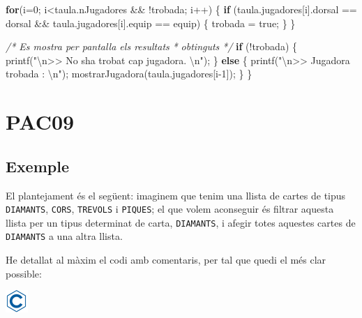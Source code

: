 \documentclass[]{book}
\newenvironment{Shaded}{\begin{snugshade}}{\end{snugshade}}
\newcommand{\CommentTok}[1]{\textcolor[rgb]{0.56,0.35,0.01}{\textit{#1}}}
\newcommand{\ControlFlowTok}[1]{\textcolor[rgb]{0.13,0.29,0.53}{\textbf{#1}}}
\newcommand{\DecValTok}[1]{\textcolor[rgb]{0.00,0.00,0.81}{#1}}
\newcommand{\NormalTok}[1]{#1}
\newcommand{\SpecialCharTok}[1]{\textcolor[rgb]{0.00,0.00,0.00}{#1}}
\newcommand{\StringTok}[1]{\textcolor[rgb]{0.31,0.60,0.02}{#1}}
\begin{document}
\begin{Shaded}
\begin{Highlighting}[]
    \ControlFlowTok{for}\NormalTok{(i=}\DecValTok{0}\NormalTok{; i\textless{}taula.nJugadores \&\& !trobada; i++) \{}
        \ControlFlowTok{if}\NormalTok{ (taula.jugadores[i].dorsal == dorsal \&\&}
\NormalTok{            taula.jugadores[i].equip == equip) \{}
\NormalTok{                trobada = true;}
\NormalTok{        \}}
\NormalTok{    \}}
    
    \CommentTok{/* Es mostra per pantalla els resultats}
\CommentTok{     * obtinguts }
\CommentTok{     */}
    \ControlFlowTok{if}\NormalTok{ (!trobada) \{}
\NormalTok{        printf(}\StringTok{"}\SpecialCharTok{\textbackslash{}n}\StringTok{\textgreater{}\textgreater{} No s\textquotesingle{}ha trobat cap jugadora. }\SpecialCharTok{\textbackslash{}n}\StringTok{"}\NormalTok{);}
\NormalTok{    \} }\ControlFlowTok{else}\NormalTok{ \{}
\NormalTok{        printf(}\StringTok{"}\SpecialCharTok{\textbackslash{}n}\StringTok{\textgreater{}\textgreater{} Jugadora trobada : }\SpecialCharTok{\textbackslash{}n}\StringTok{"}\NormalTok{);}
\NormalTok{        mostrarJugadora(taula.jugadores[i{-}}\DecValTok{1}\NormalTok{]);}
\NormalTok{    \}}
\NormalTok{\}}
\end{Highlighting}
\end{Shaded}

\hypertarget{pac09}{%
\chapter{PAC09}\label{pac09}}

\hypertarget{exemple}{%
\section{Exemple}\label{exemple}}

El plantejament és el següent: imaginem que tenim una llista de cartes de tipus \texttt{DIAMANTS}, \texttt{CORS}, \texttt{TREVOLS} i \texttt{PIQUES}; el que volem aconseguir és filtrar aquesta llista per un tipus determinat de carta, \texttt{DIAMANTS}, i afegir totes aquestes cartes de \texttt{DIAMANTS} a una altra llista.

He detallat al màxim el codi amb comentaris, per tal que quedi el més clar possible:

\includegraphics{./img/c.png}
\end{document}
